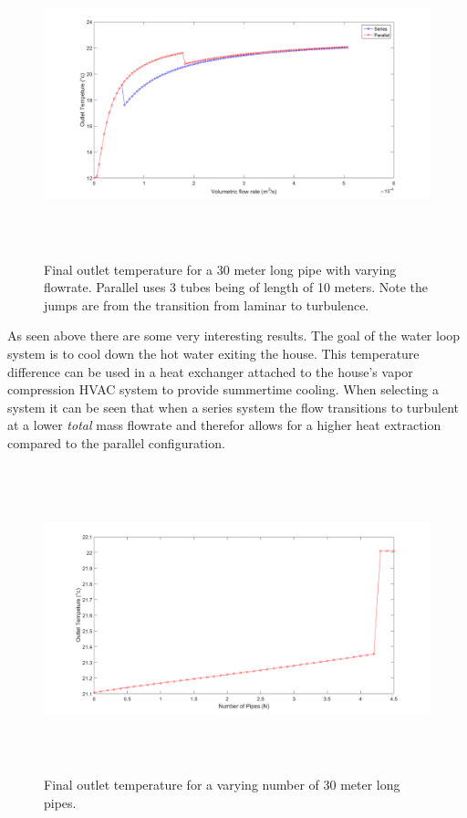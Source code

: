 \begin{figure}[H]
    \centering
    \includegraphics[height=3.5in]{pictures/outlet_11_ground_23_inlet.png}
    \caption{Final outlet temperature for a 30 meter long pipe with varying flowrate. Parallel uses 3 tubes being of length of 10 meters. Note the jumps are from the transition from laminar to turbulence.}
\end{figure}
%
\noindent
As seen above there are some very interesting results. The goal of the water loop system is to cool down the hot water exiting the house. This temperature difference can be used in a heat exchanger attached to the house's vapor compression HVAC system to provide summertime cooling. When selecting a system it can be seen that when a series system the flow transitions to turbulent at a lower \textit{total} mass flowrate and therefor allows for a higher heat extraction compared to the parallel configuration.
%
\begin{figure}[H]
    \centering
    \includegraphics[height=3.5in]{pictures/outlet_parallel_num_pipes.png}
    \caption{Final outlet temperature for a varying number of 30 meter long pipes.}
\end{figure}
